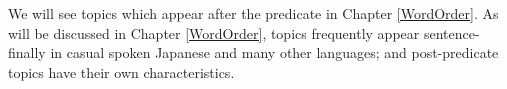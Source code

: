 We will see
topics which appear after the predicate
in Chapter \ref{WordOrder}.
As will be discussed in Chapter \ref{WordOrder},
topics frequently appear sentence-finally in casual spoken Japanese and many other languages;
and post-predicate topics have their own characteristics.

%

%
%
%

